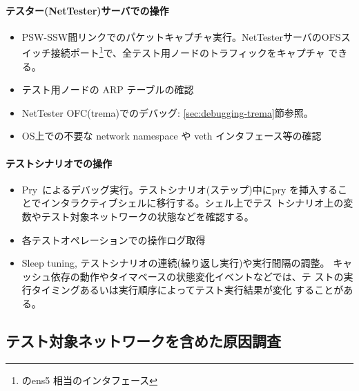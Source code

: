     \paragraph{テスター(NetTester)サーバでの操作}

\begin{itemize}
 \item PSW-SSW間リンクでのパケットキャプチャ実行。NetTesterサーバのOFSス
       イッチ接続ポート\footnote{のens5
       相当のインタフェース}で、全テスト用ノードのトラフィックをキャプチャ
       できる。
 \item テスト用ノードの ARP テーブルの確認
 \item NetTester OFC(trema)でのデバッグ: \ref{sec:debugging-trema}節参照。
 \item OS上での不要な network namespace や veth インタフェース等の確認
\end{itemize}

    \paragraph{テストシナリオでの操作}

\begin{itemize}
 \item Pry~\cite{pry}によるデバッグ実行。テストシナリオ(ステップ)中にpry
       を挿入することでインタラクティブシェルに移行する。シェル上でテス
       トシナリオ上の変数やテスト対象ネットワークの状態などを確認する。
 \item 各テストオペレーションでの操作ログ取得
 \item Sleep tuning, テストシナリオの連続(繰り返し実行)や実行間隔の調整。
       キャッシュ依存の動作やタイマベースの状態変化イベントなどでは、テ
       ストの実行タイミングあるいは実行順序によってテスト実行結果が変化
       することがある。
\end{itemize}

  \subsection{テスト対象ネットワークを含めた原因調査}

